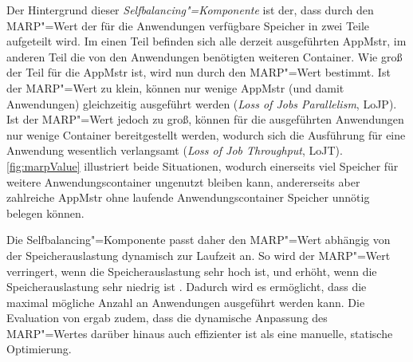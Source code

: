 Der Hintergrund dieser \emph{Selfbalancing"=Komponente} ist der, dass durch den \ac{MARP}"=Wert der für die Anwendungen verfügbare Speicher in zwei Teile aufgeteilt wird.
Im einen Teil befinden sich alle derzeit ausgeführten \ac{AppMstr}, im anderen Teil die von den Anwendungen benötigten weiteren Container.
Wie groß der Teil für die \ac{AppMstr} ist, wird nun durch den \ac{MARP}"=Wert bestimmt.
Ist der \ac{MARP}"=Wert zu klein, können nur wenige \ac{AppMstr} (und damit Anwendungen) gleichzeitig ausgeführt werden (\emph{Loss of Jobs Parallelism}, LoJP).
Ist der \ac{MARP}"=Wert jedoch zu groß, können für die ausgeführten Anwendungen nur wenige Container bereitgestellt werden, wodurch sich die Ausführung für eine Anwendung wesentlich verlangsamt (\emph{Loss of Job Throughput}, LoJT)\cite{zhang2016}.
\autoref{fig:marpValue} illustriert beide Situationen, wodurch einerseits viel Speicher für weitere Anwendungscontainer ungenutzt bleiben kann, andererseits aber zahlreiche \ac{AppMstr} ohne laufende Anwendungscontainer Speicher unnötig belegen können.

Die Selfbalancing"=Komponente passt daher den \ac{MARP}"=Wert abhängig von der Speicherauslastung dynamisch zur Laufzeit an.
So wird der \ac{MARP}"=Wert verringert, wenn die Speicherauslastung sehr hoch ist, und erhöht, wenn die Speicherauslastung sehr niedrig ist \cite{zhang2016}.
Dadurch wird es ermöglicht, dass die maximal mögliche Anzahl an Anwendungen ausgeführt werden kann.
Die Evaluation von \citeauthor{zhang2016} ergab zudem, dass die dynamische Anpassung des \ac{MARP}"=Wertes darüber hinaus auch effizienter ist als eine manuelle, statische Optimierung.

